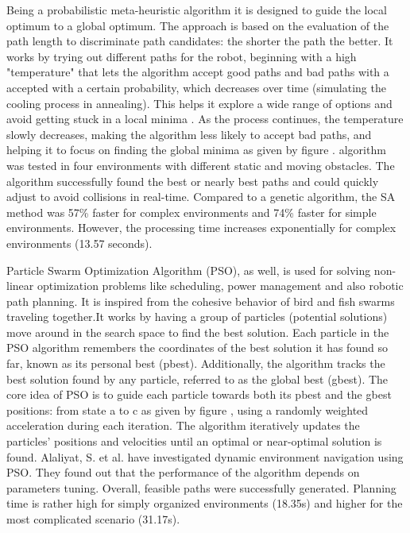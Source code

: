 Being a probabilistic meta-heuristic algorithm it is designed to guide the local
optimum to a global optimum. The approach is based on the evaluation of the path length to discriminate 
path candidates: the shorter the path the better. It works by trying out different paths for the robot, beginning 
with a high "temperature" that lets the algorithm accept good paths and bad paths with a accepted with a certain probability,
which decreases over time (simulating the cooling process in annealing). This helps it explore a wide range of 
options and avoid getting stuck in a local minima . As the process continues, the temperature slowly decreases, 
making the algorithm less likely to accept bad paths, and helping it to focus on finding the global minima as given by 
figure . algorithm was tested in four environments with different static and moving obstacles. The algorithm 
successfully found the best or nearly best paths and could quickly adjust to avoid collisions in real-time. 
Compared to a genetic algorithm, the SA method was 57\% faster for complex environments and 74\% faster for simple
environments. However, the processing time increases exponentially for complex environments (13.57 seconds).

Particle Swarm Optimization Algorithm (PSO), as well, is used for solving non-linear optimization problems like scheduling, power 
management and also robotic path planning. It is inspired from the cohesive behavior of bird and fish swarms traveling 
together.It works by having a group of particles (potential solutions) move around in the search space to find the best 
solution. Each particle in the PSO algorithm remembers the coordinates of the best solution it has found so far, known 
as its personal best (pbest). Additionally, the algorithm tracks the best solution found by any particle, referred to as 
the global best (gbest). The core idea of PSO is to guide each particle towards both its pbest and the gbest positions:
from state a to c as given by figure , 
using a randomly weighted acceleration during each iteration. The algorithm iteratively updates the particles' positions 
and velocities until an optimal or near-optimal solution is found.
Alaliyat, S. et al. have investigated dynamic environment navigation using PSO. They found out that the performance 
of the algorithm depends on parameters tuning. Overall, feasible paths were successfully generated.
Planning time is rather high for simply organized environments (18.35s) and higher for the most complicated scenario
(31.17s).

